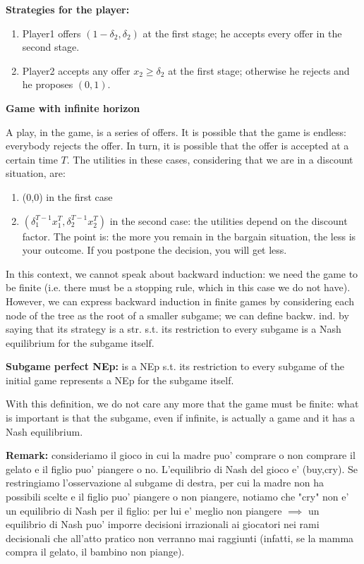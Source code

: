 \bigskip
\noindent \textbf{Strategies for the player:}

\noindent
\begin{enumerate}
	\item Player1 offers $(1-\delta_2, \delta_2)$ at the first stage; he accepts every offer in the second stage.
	\item Player2 accepts any offer $x_2 \geq \delta_2$ at the first stage; otherwise he rejects and he proposes $(0,1)$.
\end{enumerate}

\bigskip
\noindent \textbf{Game with infinite horizon}

\noindent A play, in the game, is a series of offers. It is possible that the 
game is endless: everybody rejects the offer. In turn, it is possible that the 
offer is accepted at a certain time $T$. The utilities in these cases, 
considering that we are in a discount situation, are:
\begin{enumerate}
	\item (0,0) in the first case
	\item $(\delta_1^{T-1}x_1^T,\delta_2^{T-1}x_2^T)$ in the second case: the utilities depend on the discount 
	factor. The point is: the more you remain in the bargain situation, the 
	less is your outcome. If you postpone the decision, you will get less.
\end{enumerate}

\noindent In this context, we cannot speak about backward induction: we need 
the game to be finite (i.e. there must be a stopping rule, which in this case we 
do not have). However, we can express backward induction in finite games by 
considering each node of the tree as the root of a smaller subgame; we can 
define backw. ind. by saying that its strategy is a str. s.t. its restriction 
to every subgame is a Nash equilibrium for the subgame itself.

\bigskip
\noindent \textbf{Subgame perfect NEp:} is a NEp s.t. its restriction to every subgame of the initial game represents a NEp for the subgame itself.

\bigskip
\noindent With this definition, we do not care any more that the game must be 
finite: what is important is that the subgame, even if infinite, is actually 
a game and it has a Nash equilibrium.

\noindent \textbf{Remark:} consideriamo il gioco in cui la madre puo' comprare o 
non comprare il gelato e il figlio puo' piangere o no. L'equilibrio di Nash del 
gioco e' (buy,cry). Se restringiamo l'osservazione al subgame di destra, per 
cui la madre non ha possibili scelte e il figlio puo' piangere o non piangere, 
notiamo che "cry" non e' un equilibrio di Nash per il figlio: per lui e' meglio 
non piangere $\implies$ un equilibrio di Nash puo' imporre decisioni irrazionali 
ai giocatori nei rami decisionali che all'atto pratico non verranno mai 
raggiunti (infatti, se la mamma compra il gelato, il bambino non piange).

